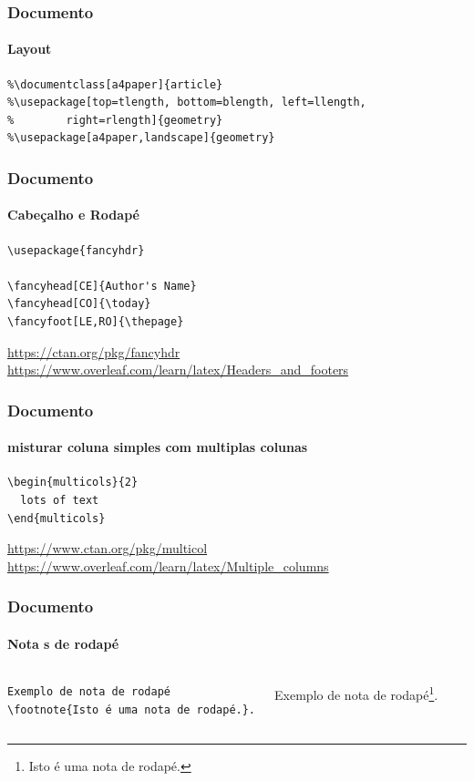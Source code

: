 \begin{frame}[fragile]
\frametitle{Documento}
\framesubtitle{Layout}
  \scriptsize
  \begin{verbatim}
%\documentclass[a4paper]{article}
%\usepackage[top=tlength, bottom=blength, left=llength,
%        right=rlength]{geometry}
%\usepackage[a4paper,landscape]{geometry}
  \end{verbatim} 
\end{frame}


\begin{frame}[fragile]
\frametitle{Documento}
\framesubtitle{Cabeçalho e Rodapé}
  \scriptsize
  \begin{verbatim}
\usepackage{fancyhdr}

\fancyhead[CE]{Author's Name}
\fancyhead[CO]{\today}
\fancyfoot[LE,RO]{\thepage}
  \end{verbatim} 
  
  \url{https://ctan.org/pkg/fancyhdr} \\
  \url{https://www.overleaf.com/learn/latex/Headers_and_footers}
\end{frame}


\begin{frame}[fragile]
\frametitle{Documento}
\framesubtitle{misturar coluna simples com multiplas colunas}
\scriptsize
\begin{verbatim}
\begin{multicols}{2}
  lots of text
\end{multicols}
\end{verbatim} 

\url{https://www.ctan.org/pkg/multicol} \\
\url{https://www.overleaf.com/learn/latex/Multiple_columns}
\end{frame}


\begin{frame}[fragile]
\frametitle{Documento}
\framesubtitle{Nota s de rodapé}
  \scriptsize
  \begin{columns}[c]
  \begin{verbatim}
Exemplo de nota de rodapé
\footnote{Isto é uma nota de rodapé.}.
  \end{verbatim} 
  \begin{fmpage}{\textwidth}
  Exemplo de nota de rodapé\footnote{Isto é uma nota de rodapé.}.
  \vspace{5cm}
  \end{fmpage}
  \end{columns}
\end{frame}

